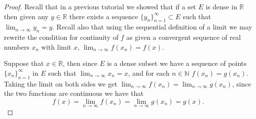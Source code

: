 \documentclass[11pt]{article}
\theoremstyle{plain}
\theoremstyle{remark}
\newcommand {\mbR} {\mathbb R}
\newcommand {\mbN} {\mathbb N}
\begin{document}
	\begin{proof}
		Recall that in a previous tutorial we showed that if a set $E$ is dense in $\mbR$ then given any $y\in \mbR$ there exists a sequence $\{y_n\}_{n=1}^\infty \subset E$ such that $\displaystyle \lim_{n\rightarrow \infty} y_n=y$. Recall also that using the sequential definition of a limit we may rewrite the condition for continuity of $f$ as given a convergent sequence of real numbers $x_n$ with limit $x$, $\displaystyle \lim_{n\rightarrow \infty} f(x_n)=f(x)$. 
		
		Suppose that $x\in \mbR$, then since $E$ is a dense subset we have a sequence of points $\{x_n\}_{n=1}^\infty$ in $E$ such that $\displaystyle\lim_{n\rightarrow \infty}x_n=x$, and for each $n\in\mbN$ $f(x_n)=g(x_n)$. Taking the limit on both sides we get $\displaystyle\lim_{n\rightarrow \infty}f(x_n)=\displaystyle\lim_{n\rightarrow \infty}g(x_n)$, since the two functions are continuous we have that \[f(x)=\displaystyle\lim_{n\rightarrow \infty}f(x_n)=\displaystyle\lim_{n\rightarrow \infty}g(x_n) = g(x).\]
	\end{proof}
	
\end{document}
